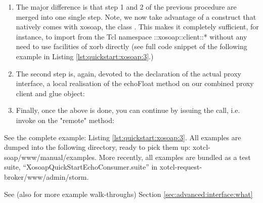 \begin{enumerate}
\item The major difference is that step 1 and 2 of the previous
  procedure are merged into one single step. Note, we now take advantage
  of a construct that natively comes with xosoap, the class
  . This makes it completely
  sufficient, for instance, to import from the Tcl namespace
  ::xosoap::client::* without any need to use facilities of xorb
  directly (see full code snippet of the following example in Listing
  \ref{lst:quickstart:xosoap:3}.)
  \lstset{breaklines=true,numbers=left,basicstyle=\footnotesize,frame=single,tabsize=2}
  
\item The second step is, again, devoted to the declaration of the
  actual proxy interface, a local realisation of the echoFloat method on
  our combined proxy client and glue object:
%
  
\item Finally, once the above is done, you can continue by issuing the
  call, i.e. invoke on the "remote" method:
  
\end{enumerate}

\begin{hints}
\item See the complete example: Listing
  \ref{lst:quickstart:xosoap:3}. All examples are dumped into the
  following directory, ready to pick them up:
  xotcl-soap/www/manual/examples. More recently, all examples are
  bundled as a test suite, ``XosoapQuickStartEchoConsumer.suite'' in
  xotcl-request-broker/www/admin/storm.
\item See (also for more example walk-throughs) Section
  \ref{sec:advanced:interface:what}
\end{hints}
  
